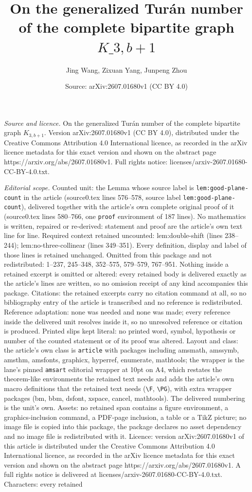 \documentclass[10pt,a4paper]{amsart}
\title[On the generalized Tur\'{a}n number of the complete bipartit]{On the generalized Tur\'{a}n number of the complete bipartite graph $K\_{3,b+1}$}
\author{Jing Wang, Zixuan Yang, Junpeng Zhou}
\date{Source: arXiv:2607.01680v1 (CC BY 4.0)}
\begin{document}
\maketitle

\noindent\emph{Source and licence.} On the generalized Tur\'{a}n number of the complete bipartite graph $K_{3,b+1}$. Version arXiv:2607.01680v1 (CC BY 4.0), distributed under the Creative Commons Attribution 4.0 International licence, as recorded in the arXiv licence metadata for this exact version and shown on the abstract page https://arxiv.org/abs/2607.01680v1. Full rights notice: licenses/arxiv-2607.01680-CC-BY-4.0.txt.\par\smallskip

\noindent\textit{Editorial scope.} Counted unit: the Lemma whose source label is \texttt{lem:good-plane-count} in the article (source0.tex lines 576--578, source label \texttt{lem:good-plane-count}), delivered together with the article's own complete original proof of it (source0.tex lines 580--766, one \texttt{proof} environment of 187 lines). No mathematics is written, repaired or re-derived: statement and proof are the article's own text line for line. Required context retained uncounted: lem:double-shift (lines 238--244); lem:no-three-collinear (lines 349--351). Every definition, display and label of those lines is retained unchanged. Omitted from this package and not redistributed: 1--237, 245--348, 352--575, 579--579, 767--951. Nothing inside a retained excerpt is omitted or altered: every retained body is delivered exactly as the article's lines are written, so no omission receipt of any kind accompanies this package. Citations: the retained excerpts carry no citation command at all, so no bibliography entry of the article is transcribed and no reference is redistributed. Reference adaptation: none was needed and none was made; every reference inside the delivered unit resolves inside it, so no unresolved reference or citation is produced. Printed slips kept literal: no printed word, symbol, hypothesis or number of the counted statement or of its proof was altered. Layout and class: the article's own class is \texttt{article} with packages including amsmath, amssymb, amsthm, amsfonts, graphicx, hyperref, enumerate, mathtools; the wrapper is the lane's pinned \texttt{amsart} editorial wrapper at 10pt on A4, which restates the theorem-like environments the retained text needs and adds the article's own macro definitions that the retained text needs (\texttt{\textbackslash F}, \texttt{\textbackslash PG}), with extra wrapper packages (bm, bbm, dsfont, xspace, cancel, mathtools). The delivered numbering is the unit's own. Assets: no retained span contains a figure environment, a graphics-inclusion command, a PDF-page inclusion, a table or a TikZ picture; no image file is copied into this package, the package declares no asset dependency and no image file is redistributed with it. Licence: version arXiv:2607.01680v1 of this article is distributed under the Creative Commons Attribution 4.0 International licence, as recorded in the arXiv licence metadata for this exact version and shown on the abstract page https://arxiv.org/abs/2607.01680v1. A full rights notice is delivered at licenses/arxiv-2607.01680-CC-BY-4.0.txt. Characters: every retained 
\end{document}
